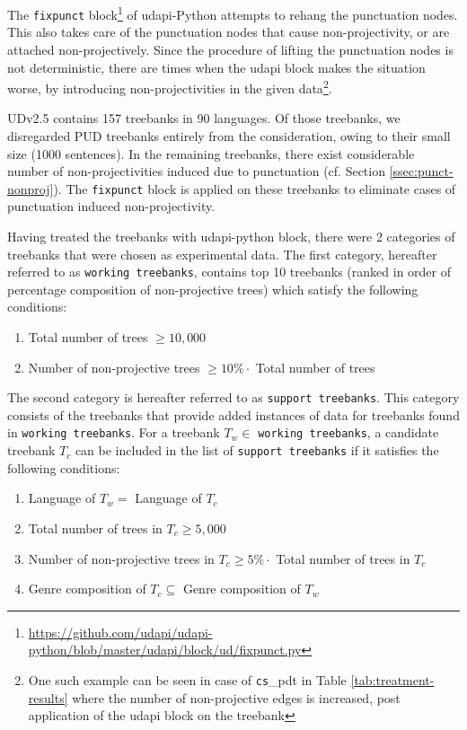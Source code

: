 The \verb|fixpunct| block\footnote{\url{https://github.com/udapi/udapi-python/blob/master/udapi/block/ud/fixpunct.py}} of udapi-Python \citep{udapi} attempts to rehang the punctuation nodes. This also takes care of the punctuation nodes that cause non-projectivity, or are attached non-projectively. Since the procedure of lifting the punctuation nodes is not deterministic, there are times when the udapi block makes the situation worse, by introducing non-projectivities in the given data\footnote{One such example can be seen in case of \texttt{cs}\_pdt in Table \ref{tab:treatment-results} where the number of non-projective edges is increased, post application of the udapi block on the treebank}.

UDv2.5 contains 157 treebanks in 90 languages. Of those treebanks, we disregarded PUD treebanks entirely from the consideration, owing to their small size (1000 sentences). In the remaining treebanks, there exist considerable number of non-projectivities induced due to punctuation (cf. Section \ref{ssec:punct-nonproj}). The \verb|fixpunct| block is applied on these treebanks to eliminate cases of punctuation induced non-projectivity.

Having treated the treebanks with udapi-python block, there were 2 categories of treebanks that were chosen as experimental data. The first category, hereafter referred to as \texttt{working treebanks}, contains top 10 treebanks (ranked in order of percentage composition of non-projective trees) which satisfy the following conditions:
\begin{enumerate}
    \item Total number of trees \(\geq 10,000\)
    \item Number of non-projective trees \(\geq 10\% \cdot \) Total number of trees
\end{enumerate}
The second category is hereafter referred to as \texttt{support treebanks}. This category consists of the treebanks that provide added instances of data for treebanks found in \texttt{working treebanks}. For a treebank \(T_{w} \in\) \texttt{working treebanks}, a candidate treebank \(T_{c}\) can be included in the list of \texttt{support treebanks} if it satisfies the following conditions:
\begin{enumerate}
    \item Language of \(T_{w} = \) Language of \(T_{c}\)
    \item Total number of trees in \(T_{c} \geq 5,000\)
    \item Number of non-projective trees in \(T_{c} \geq 5\% \cdot \) Total number of trees in \(T_{c}\)
    \item Genre composition of \(T_{c} \subseteq \) Genre composition of \(T_{w}\)
\end{enumerate}

